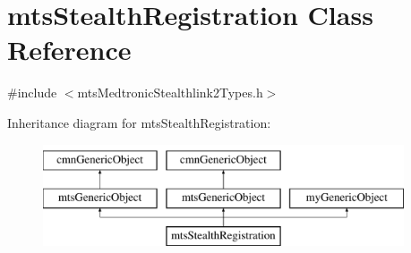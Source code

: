 \hypertarget{classmts_stealth_registration}{}\section{mts\+Stealth\+Registration Class Reference}
\label{classmts_stealth_registration}


{\ttfamily \#include $<$mts\+Medtronic\+Stealthlink2\+Types.\+h$>$}

Inheritance diagram for mts\+Stealth\+Registration\+:\begin{figure}[H]
\begin{center}
\leavevmode
\includegraphics[height=3.000000cm]{db/d4a/classmts_stealth_registration}
\end{center}
\end{figure}
